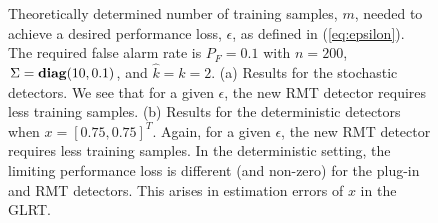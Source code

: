 \begin{figure}
\centering
{}
\vspace{-0.1in}
\caption{Theoretically determined number of training samples, $m$, needed to achieve a desired performance loss, $\epsilon$, as defined in (\ref{eq:epsilon}). The required false alarm rate is $P_F=0.1$ with $n=200$, $\Sigma = \mathop{\bf diag}(10,0.1)$, and $\widehat{k}=k=2$. (a) Results for the stochastic detectors. We see that for a given $\epsilon$, the new RMT detector requires less training samples. (b) Results for the deterministic detectors when $x=[0.75,0.75]^T$. Again, for a given $\epsilon$, the new RMT detector requires less training samples. In the deterministic setting, the limiting performance loss is different (and non-zero) for the plug-in and RMT detectors. This arises in estimation errors of $x$ in the GLRT.}
\label{fig:epsilon_combined}
\end{figure}



